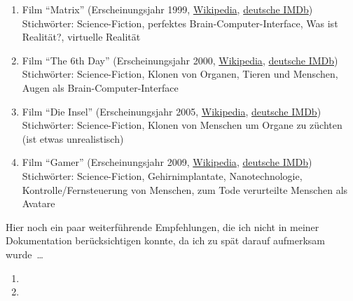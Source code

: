 \begin{enumerate}
	\item Film \enquote{Matrix}
		(Erscheinungsjahr 1999, \href{http://de.wikipedia.org/wiki/Matrix_(Film)}{Wikipedia},
		\href{http://www.imdb.de/title/tt0133093/}{deutsche IMDb}) \\
		Stichwörter: Science-Fiction, perfektes Brain-Computer-Interface,
		Was ist Realität?, virtuelle Realität
	\item Film \enquote{The 6th Day}
		(Erscheinungsjahr 2000, \href{http://de.wikipedia.org/wiki/The_6th_Day}{Wikipedia},
		\href{http://www.imdb.de/title/tt0216216/}{deutsche IMDb}) \\
		Stichwörter: Science-Fiction, Klonen von Organen, Tieren und Menschen,
			Augen als Brain-Computer-Interface
	\item Film \enquote{Die Insel}
		(Erscheinungsjahr 2005, \href{http://de.wikipedia.org/wiki/Die_Insel_(2005)}{Wikipedia},
		\href{http://www.imdb.de/title/tt0399201/}{deutsche IMDb}) \\
		Stichwörter: Science-Fiction, Klonen von Menschen um Organe zu züchten
			(ist etwas unrealistisch)
	\item Film \enquote{Gamer}
		(Erscheinungsjahr 2009, \href{http://de.wikipedia.org/wiki/Gamer}{Wikipedia},
		\href{http://www.imdb.de/title/tt1034032/}{deutsche IMDb}) \\
		Stichwörter: Science-Fiction, Gehirnimplantate, Nanotechnologie,
			Kontrolle/Fernsteuerung von Menschen,
			zum Tode verurteilte Menschen als Avatare
\end{enumerate}

\bigskip
Hier noch ein paar weiterführende Empfehlungen, die ich nicht in meiner Dokumentation
berücksichtigen konnte, da ich zu spät darauf aufmerksam wurde~\dots
\begin{enumerate}
	\item {}
	\item {}
\end{enumerate}



